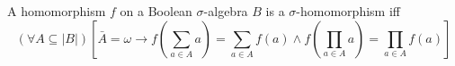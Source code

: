 A homomorphism $f$ on a Boolean $\sigma$-algebra $B$ is a $\sigma$-homomorphism iff
$$
(\forall A \subseteq |B|) \left[ \bar{A} = \omega \rightarrow f\left(\sum_{a \in A} a\right) = \sum_{a \in A} f(a) \land f\left(\prod_{a \in A} a\right) = \prod_{a \in A} f(a) \right]
$$
